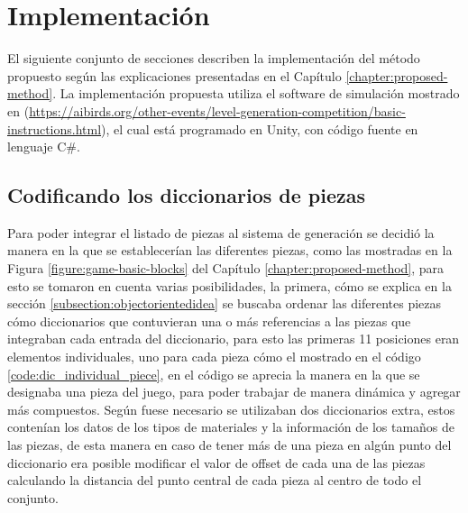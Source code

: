 \chapter{Implementación}
\label{chapter:implementation}

El siguiente conjunto de secciones describen la implementación del método
propuesto según las explicaciones presentadas en el Capítulo
\ref{chapter:proposed-method}. La implementación propuesta utiliza el software
de simulación mostrado en \cite{Renz2013}
(\url{https://aibirds.org/other-events/level-generation-competition/basic-instructions.html}),
el cual está programado en Unity, con código fuente en
lenguaje C\#. 

\section{Codificando los diccionarios de piezas}
\label{section:piece_dictionary}

Para poder integrar el listado de piezas al
sistema de generación se decidió la manera en la que se establecerían las
diferentes piezas, como las mostradas en la Figura \ref{figure:game-basic-blocks}
del Capítulo \ref{chapter:proposed-method}, para esto se tomaron en cuenta
varias posibilidades, la primera, cómo se explica en la sección
\ref{subsection:objectorientedidea} se buscaba ordenar las diferentes piezas
cómo diccionarios que contuvieran una o más referencias a las piezas que
integraban cada entrada del diccionario, para esto las primeras 11 posiciones
eran elementos individuales, uno para cada pieza cómo el mostrado en el código
\ref{code:dic_individual_piece}, en el código se aprecia la manera en la que se
designaba una pieza del juego, para poder trabajar de manera dinámica y
agregar más compuestos. Según fuese necesario se utilizaban dos diccionarios
extra, estos contenían los datos de los tipos de materiales y la
información de los tamaños de las piezas, de esta manera en caso de tener más de
una pieza en algún punto del diccionario era posible modificar el valor de
offset de cada una de las piezas calculando la distancia del punto central de
cada pieza al centro de todo el conjunto.

